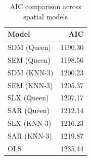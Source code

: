 \begin{table}[ht]
\centering
\caption{AIC comparison across spatial models} 
\label{tab:aic}
\begin{tabular}{lr}
  \toprule
Model & AIC \\ 
  \midrule
SDM (Queen) & 1190.30 \\ 
  SEM (Queen) & 1198.56 \\ 
  SDM (KNN-3) & 1200.23 \\ 
  SEM (KNN-3) & 1205.37 \\ 
  SLX (Queen) & 1207.17 \\ 
  SAR (Queen) & 1212.14 \\ 
  SLX (KNN-3) & 1216.23 \\ 
  SAR (KNN-3) & 1219.87 \\ 
  OLS & 1235.44 \\ 
   \bottomrule
\end{tabular}
\end{table}
